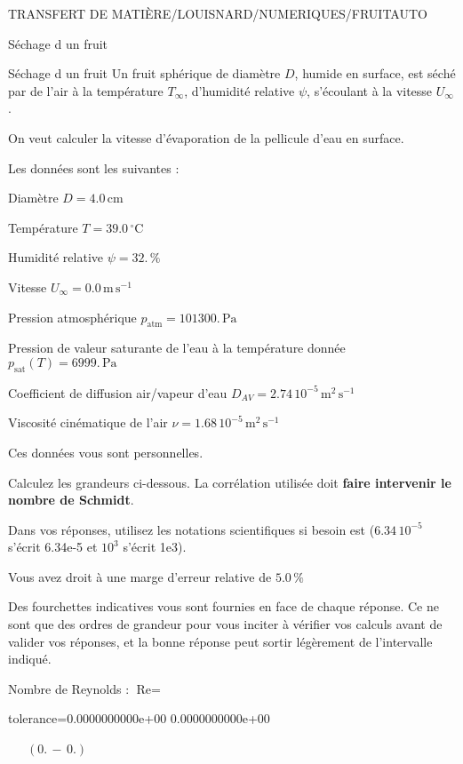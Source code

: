 \documentclass[12pt]{article}
\begin{document}
\begin{quiz}{TRANSFERT DE MATIÈRE/LOUISNARD/NUMERIQUES/FRUITAUTO}
\begin{cloze}{Séchage d un fruit}
\end{cloze} 


 \begin{cloze}{Séchage d un fruit} 
Un fruit sphérique de diamètre $D$, humide en surface, est séché par de l'air à la température $T_\infty$, d'humidité relative $\psi$, s'écoulant à la vitesse $U_\infty$.

On veut calculer la vitesse d'évaporation de la pellicule d'eau en surface.

 

Les données sont les suivantes :

 

Diamètre $D = 4.0\,  \mathrm{cm} $

Température $T = 39.0\,  \mathrm{^\circ\mathrm{C}} $

Humidité relative $\psi = 32.\, \% $

Vitesse $U_\infty = 0.0\,  \mathrm{m}\,  \mathrm{s}^{-1} $

Pression atmosphérique $p_{\text{atm}} = 101300.\,  \mathrm{Pa} $

Pression de valeur saturante de l’eau à la température donnée $p_{\text{sat}}(T) = 6999.\,  \mathrm{Pa} $

Coefficient de diffusion air/vapeur d’eau $D_{AV} =  2.74 \, 10^{-5} \,  \mathrm{m}^{2}\,  \mathrm{s}^{-1} $

Viscosité cinématique de l’air $\nu =  1.68 \, 10^{-5} \,  \mathrm{m}^{2}\,  \mathrm{s}^{-1} $

Ces données vous sont personnelles.

 

Calculez les grandeurs ci-dessous. La corrélation utilisée doit \textbf{faire intervenir le nombre de Schmidt}.

Dans vos réponses, utilisez les notations scientifiques si besoin est ($6.34\, 10^{-5}$ s'écrit 6.34e-5 et $10^{3}$ s'écrit 1e3).

Vous avez droit à une marge d'erreur relative de $5.0\, \% $

Des fourchettes indicatives vous sont fournies en face de chaque réponse. Ce ne sont que des ordres de grandeur pour vous inciter à vérifier vos calculs avant de valider vos réponses, et la bonne réponse peut sortir légèrement de l'intervalle indiqué.

 

Nombre de Reynolds : $\text{Re} =  $
\begin{numerical}[points=1] 
\item[tolerance={0.0000000000e+00}] 0.0000000000e+00 
\end{numerical} 
 $\,$ 
 $ \quad (0. \, - \, 0.) $ 


\end{cloze}
\end{quiz}
\end{document}
